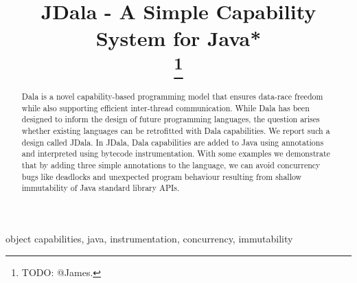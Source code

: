 \documentclass[conference]{IEEEtran}
\newcommand{\dala}{Dala\xspace}
\newcommand{\jdala}{JDala\xspace}
\begin{document}
	
	

\title{JDala - A Simple Capability System for Java*\\
\thanks{TODO: @James.}
}

\author{
}


\maketitle

\begin{abstract}


\dala is a novel capability-based programming model that ensures data-race freedom while also supporting efficient inter-thread communication. While \dala has been designed to inform the design of future programming languages, the question arises whether existing languages can be retrofitted with \dala capabilities. We report such a design called \jdala. In \jdala,  \dala capabilities are added to Java using annotations and interpreted using bytecode instrumentation. With some examples we demonstrate that by adding three simple annotations to the language, we can avoid concurrency bugs like deadlocks and unexpected program behaviour resulting from shallow immutability of Java standard library APIs. 

\end{abstract}

\begin{IEEEkeywords}
object capabilities, java, instrumentation, concurrency, immutability 
\end{IEEEkeywords}

















\end{document}
